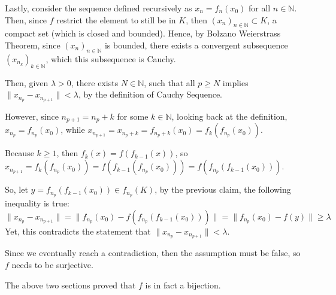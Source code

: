 \documentclass{article}
\begin{document}
\hfil

Lastly, consider the sequence defined recursively as $x_n=f_n(x_0)$ for all $n\in\mathbb{N}$. Then, since $f$ restrict the element to still be in $K$, then $(x_n)_{n\in\mathbb{N}}\subset K$, a compact set (which is closed and bounded).
Hence, by Bolzano Weierstrass Theorem, since $(x_n)_{n\in\mathbb{N}}$ is bounded, there exists a convergent subsequence $(x_{n_k})_{k\in\mathbb{N}}$, which this subsequence is Cauchy.

Then, given $\lambda>0$, there exists $N\in\mathbb{N}$, such that all $p\geq N$ implies $\|x_{n_p}-x_{n_{p+1}}\| < \lambda$, by the definition of Cauchy Sequence.

However, since $n_{p+1}=n_p+k$ for some $k\in\mathbb{N}$, looking back at the definition, $x_{n_p}=f_{n_p}(x_0)$, while $x_{n_{p+1}}=x_{n_p+k}=f_{n_p+k}(x_0) = f_k(f_{n_p}(x_0))$.

Because $k\geq 1$, then $f_k(x) = f(f_{k-1}(x))$, so $x_{n_{p+1}}=f_k(f_{n_p}(x_0))=f(f_{k-1}(f_{n_p}(x_0))) = f(f_{n_p}(f_{k-1}(x_0)))$.

So, let $y=f_{n_p}(f_{k-1}(x_0))\in f_{n_p}(K)$, by the previous claim, the following inequality is true:
$$\|x_{n_p}-x_{n_{p+1}}\| = \|f_{n_p}(x_0)-f(f_{n_p}(f_{k-1}(x_0)))\| = \|f_{n_p}(x_0)-f(y)\| \geq \lambda$$
Yet, this contradicts the statement that $\|x_{n_p}-x_{n_{p+1}}\| < \lambda$.

\hfil

Since we eventually reach a contradiction, then the assumption must be false, so $f$ needs to be surjective.

\hfil

The above two sections proved that $f$ is in fact a bijection.
\end{document}
